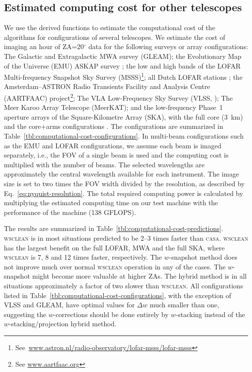 \documentclass[useAMS,usenatbib]{mn2e}
\newcommand{\degree}{\ensuremath{^{\circ}}\xspace}
\begin{document}
\subsection{Estimated computing cost for other telescopes} \label{sec:application-to-nonmwa}
We use the derived functions to estimate the computational cost of the algorithms for configurations of several telescopes. We estimate the cost of imaging an hour of ZA=20\degree data for the following surveys or array configurations: The Galactic and Extragalactic MWA survey (GLEAM); the Evolutionary Map of the Universe (EMU) ASKAP survey \citep{emu-norris-2011}; the low and high bands of the LOFAR Multi-frequency Snapshot Sky Survey (MSSS)\footnote{See~\href{https://www.astron.nl/radio-observatory/lofar-msss/lofar-msss}{www.astron.nl/radio-observatory/lofar-msss/lofar-msss}}; all Dutch LOFAR stations \citep{lofar-2013}; the Amsterdam--ASTRON Radio Transients Facility and Analysis Centre (AARTFAAC) project\footnote{See \href{http://www.aartfaac.org}{www.aartfaac.org}}; The VLA Low-Frequency Sky Survey (VLSS, \citealt{vlss-2007}); The Meer Karoo Array Telescope (MeerKAT); and the low-frequency Phase~1 aperture arrays of the Square-Kilometre Array (SKA), with the full core (3~km) and the core+arms configurations \citep{ska-phase1-2013}. The configurations are summarized in Table~\ref{tbl:computational-cost-configurations}. In multi-beam configurations such as the EMU and LOFAR configurations, we assume each beam is imaged separately, i.e., the FOV of a single beam is used and the computing cost is multiplied with the number of beams. The selected wavelengths 
are approximately the central wavelength available for each instrument. The image size is set to two times the FOV width divided by the resolution, as described by Eq.~\ref{eq:nyquist-resolution}. The total required computing power is calculated by multiplying the estimated computing time on our test machine with the performance of the machine (138 GFLOPS).

The results are summarized in Table~\ref{tbl:computational-cost-predictions}. \textsc{wsclean} is in most situations predicted to be 2--3 times faster than \textsc{casa}. \textsc{wsclean} has the largest benefit on the full LOFAR, MWA and the full SKA, where \textsc{wsclean} is 7, 8 and 12 times faster, respectively. The $w$-snapshot method does not improve much over normal \textsc{wsclean} operation in any of the cases. The $w$-snapshot might become more valuable at higher ZAs. The hybrid method is in all situations approximately a factor of two slower than \textsc{wsclean}. All configurations listed in Table~\ref{tbl:computational-cost-configurations}, with the exception of VLSS and GLEAM, have optimal values for $\Delta w$ much smaller than one, suggesting the $w$-corrections should be done entirely by $w$-stacking instead of the $w$-stacking/projection hybrid method.
\end{document}

